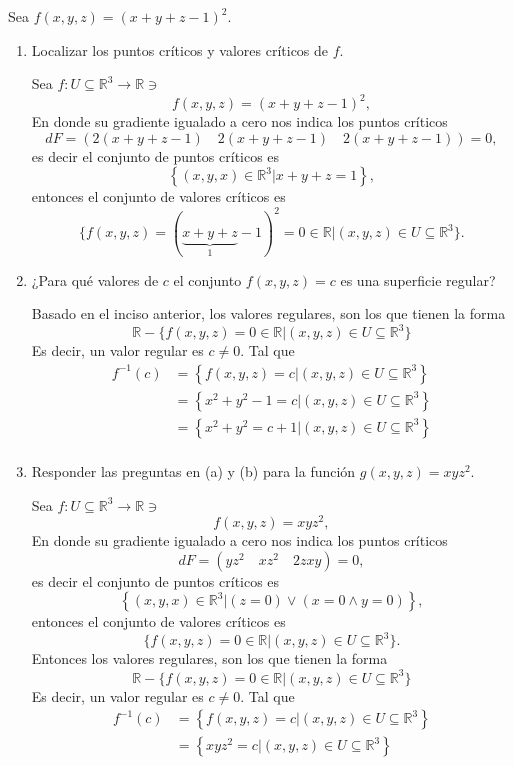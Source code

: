 \begin{problema}
    Sea $f(x, y, z)=(x+y+z-1)^2$.
    \begin{enumerate}
        \item Localizar los puntos críticos y valores críticos de $f$.
        \begin{sol}
            Sea $f: U\subseteq \mathbb{R}^3\to \mathbb{R}\ni$
        $$f(x,y,z)= (x+y+z-1)^2,$$
        En donde su gradiente igualado a cero nos indica los puntos críticos
        $$dF =\left(2(x+y+z-1)\quad 2(x+y+z-1) \quad 2(x+y+z-1)\right)=0,$$
        es decir el conjunto de puntos críticos es 
        $$\left\{(x,y,x)\in \mathbb{R}^3| x+y+z=1\right\},$$ entonces el conjunto de valores críticos es $$\{f(x,y,z)=(\underbrace{x+y+z}_1-1)^2=0\in \mathbb{R}|(x,y,z)\in U\subseteq\mathbb{R}^3\}.$$
        \end{sol}
        \item ¿Para qué valores de $c$ el conjunto $f(x, y, z)=c$ es una superficie regular?
        \begin{sol}
            Basado en el inciso anterior, los valores regulares, son los que tienen la forma $$\mathbb{R}-\{f(x,y,z)=0\in \mathbb{R}|(x,y,z)\in U\subseteq\mathbb{R}^3\}$$
            Es decir, un valor regular es $c\neq0$. Tal que 
            \begin{align*}
                f^{-1}(c) &=\left\{f(x,y,z)=c| (x,y,z)\in U\subseteq \mathbb{R}^3\right\}\\
                &= \left\{x^2+y^2-1=c| (x,y,z)\in U\subseteq \mathbb{R}^3\right\}\\
                &= \left\{x^2+y^2=c+1| (x,y,z)\in U\subseteq \mathbb{R}^3\right\}\\
            \end{align*}
        \end{sol}
        \item Responder las preguntas en (a) y (b) para la función $g(x, y, z)=x y z^2$.
        \begin{sol}
            Sea $f: U\subseteq \mathbb{R}^3\to \mathbb{R}\ni$
        $$f(x,y,z)= xyz^2,$$
        En donde su gradiente igualado a cero nos indica los puntos críticos
        $$dF =\left(yz^2\quad xz^2 \quad 2zxy\right)=0,$$
        es decir el conjunto de puntos críticos es 
        $$\left\{(x,y,x)\in \mathbb{R}^3| (z=0)\vee (x=0\wedge y=0)\right\},$$ entonces el conjunto de valores críticos es $$\{f(x,y,z)=0\in \mathbb{R}|(x,y,z)\in U\subseteq\mathbb{R}^3\}.$$
        Entonces los valores regulares, son los que tienen la forma $$\mathbb{R}-\{f(x,y,z)=0\in \mathbb{R}|(x,y,z)\in U\subseteq\mathbb{R}^3\}$$
        Es decir, un valor regular es $c\neq0$. Tal que 
        \begin{align*}
            f^{-1}(c) &=\left\{f(x,y,z)=c| (x,y,z)\in U\subseteq \mathbb{R}^3\right\}\\
            &= \left\{xyz^2=c| (x,y,z)\in U\subseteq \mathbb{R}^3\right\}
        \end{align*}
        \end{sol}
    \end{enumerate}


\end{problema}

